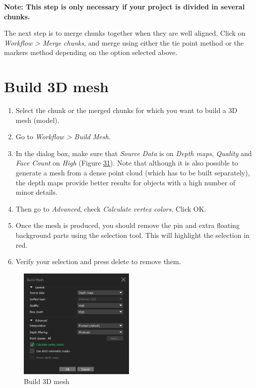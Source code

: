 \documentclass[
]{book}
\begin{document}
\textbf{Note: This step is only necessary if your project is divided in
several chunks.}

The next step is to merge chunks together when they are well aligned.
Click on \emph{Workflow \textgreater{} Merge chunks}, and merge using either the tie
point method or the markers method depending on the option selected
above.

\hypertarget{build-3d-mesh}{%
\section{Build 3D mesh}\label{build-3d-mesh}}

\begin{enumerate}
\def\labelenumi{\arabic{enumi}.}
\item
  Select the chunk or the merged chunks for which you want to build a
  3D mesh (model).
\item
  Go to \emph{Workflow \textgreater{} Build Mesh}.
\item
  In the dialog box, make sure that \emph{Source Data} is on \emph{Depth maps},
  \emph{Quality} and \emph{Face Count} on \emph{High} (Figure
  \protect\hyperlink{fig:3d_mesh}{31}).
  Note that although it is also possible to generate a mesh from a
  dense point cloud (which has to be built separately), the depth maps
  provide better results for objects with a high number of minor
  details.
\item
  Then go to \emph{Advanced}, check \emph{Calculate vertex colors}. Click OK.
\item
  Once the mesh is produced, you should remove the pin and extra
  floating background parts using the selection tool. This will
  highlight the selection in red.
\item
  Verify your selection and press delete to remove them.
\end{enumerate}

\begin{figure}
\hypertarget{fig:3d_mesh}{%
\centering
\includegraphics[width=0.5\textwidth,height=\textheight]{Figures/metashape_build_mesh.png}
\caption{Build 3D mesh}\label{fig:3d_mesh}
}
\end{figure}
\end{document}
